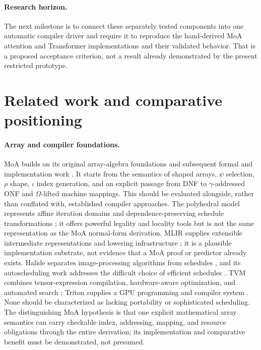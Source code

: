 \documentclass[11pt]{article}
\begin{document}
\paragraph{Research horizon.}
The next milestone is to connect these separately tested components
into one automatic compiler driver and require it to reproduce the
hand-derived MoA attention and Transformer implementations and their
validated behavior.  That is a proposed acceptance criterion, not
a result already demonstrated by the present restricted prototype.


\section{Related work and comparative positioning}
\label{sec:related}
\paragraph{Array and compiler foundations.}
MoA builds on its original array-algebra foundations and subsequent formal and implementation work \cite{mullin1988,hainsmullin1993,mullinjenkins1996,mullin2005,groutmullin2022,markusmullin2024,hainsmullin2026,pythonmoa}. It starts from the semantics of shaped arrays, $\psi$ selection, $\rho$ shape, $\iota$ index generation, and an explicit passage from DNF to $\gamma$-addressed ONF and $\Omega$-lifted machine mappings. This should be evaluated alongside, rather than conflated with, established compiler approaches. The polyhedral model represents affine iteration domains and dependence-preserving schedule transformations \cite{feautrier,pluto}; it offers powerful legality and locality tools but is not the same representation as the MoA normal-form derivation. MLIR supplies extensible intermediate representations and lowering infrastructure \cite{mlir}; it is a plausible implementation substrate, not evidence that a MoA proof or predictor already exists. Halide separates image-processing algorithms from schedules \cite{halide}, and its autoscheduling work addresses the difficult choice of efficient schedules \cite{halideauto}. TVM combines tensor-expression compilation, hardware-aware optimization, and automated search \cite{tvm,ansor}; Triton supplies a GPU programming and compiler system \cite{triton}. None should be characterized as lacking portability or sophisticated scheduling. The distinguishing MoA hypothesis is that one explicit mathematical array semantics can carry checkable index, addressing, mapping, and resource obligations through the entire derivation; its implementation and comparative benefit must be demonstrated, not presumed.
\end{document}
